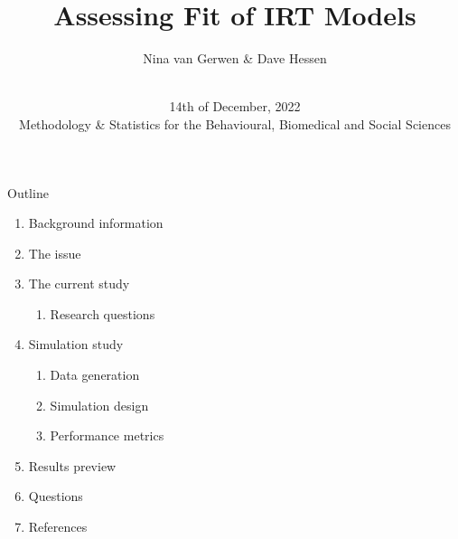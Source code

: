 \documentclass[aspectratio=169]{beamer}
\title{Assessing Fit of IRT Models}
\author{Nina van Gerwen \& Dave Hessen}
\date{\vspace{0.5cm} \\ 14th of December, 2022 \\ \vspace{0.5cm}
\small{Methodology \& Statistics for the Behavioural, Biomedical and Social Sciences}}
\begin{document}
\maketitle


{

\begin{frame}{Outline}

\begin{enumerate}
	\item{Background information}
	\item{The issue}
	\item{The current study}
		\begin{enumerate}
			\item{Research questions}
		\end{enumerate}
	\item{Simulation study}
		\begin{enumerate}
			\item{Data generation}
			\item{Simulation design}
			\item{Performance metrics}
		\end{enumerate}
	\item{Results preview}
	\item{Questions}
	\item{References}
\end{enumerate}

\end{frame}}
\end{document}
